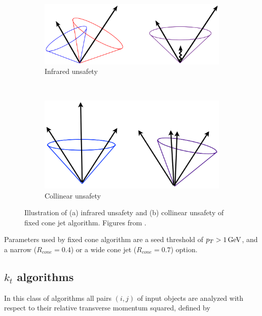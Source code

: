 \begin{figure}[t]
  \centering
  \begin{subfigure}[b]{0.65\textwidth}
    \includegraphics[width=\textwidth]{Chapter2/IRsafety.png}
    \caption{Infrared unsafety}
    \label{fig:IRsafety}
  \end{subfigure}
  ~
  \begin{subfigure}[b]{0.6\textwidth}
    \includegraphics[width=\textwidth]{Chapter2/ColSafety.png}
    \caption{Collinear unsafety}
    \label{fig:ColSafety}
  \end{subfigure}
  \caption{Illustration of (a) infrared unsafety and (b) collinear unsafety
    of fixed cone jet algorithm.
    Figures from \cite{JetTheoreticalPictures}.}
  \label{fig:JetIRCOLsafety}
\end{figure}

Parameters used by fixed cone algorithm are a seed threshold of $p_{T} > 1 \,\text{GeV}$,
and a narrow ($R_{cone} = 0.4$) or a wide cone jet ($R_{cone} = 0.7$) option.

\subsection{$k_t$ algorithms}

In this class of algorithms all pairs $(i,j)$ of input objects are analyzed with
respect to their relative transverse momentum squared, defined by 

